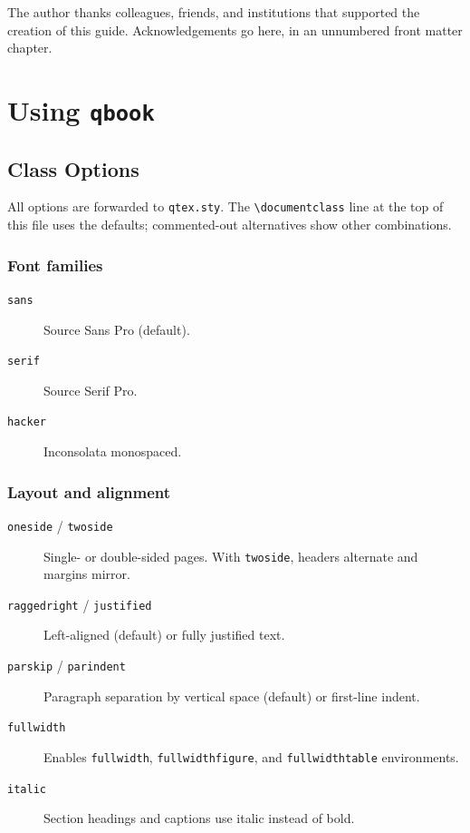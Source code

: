 \documentclass[sans,oneside,numeric,raggedright,fullwidth]{qbook}
\begin{document}
The author thanks colleagues, friends, and institutions that supported the
creation of this guide.  Acknowledgements go here, in an unnumbered front
matter chapter.

\lipsum[1]

\mainmatter

\chapter{Using \texttt{qbook}}\label{ch:using}

\section{Class Options}\label{sec:options}

All options are forwarded to \texttt{qtex.sty}.  The \verb|\documentclass|
line at the top of this file uses the defaults; commented-out alternatives
show other combinations.

\subsection{Font families}

\begin{description}
  \item[\texttt{sans}] Source Sans Pro (default).
  \item[\texttt{serif}] Source Serif Pro.
  \item[\texttt{hacker}] Inconsolata monospaced.
\end{description}

\subsection{Layout and alignment}

\begin{description}
  \item[\texttt{oneside} / \texttt{twoside}] Single- or double-sided pages.
    With \texttt{twoside}, headers alternate and margins mirror.
  \item[\texttt{raggedright} / \texttt{justified}] Left-aligned (default) or
    fully justified text.
  \item[\texttt{parskip} / \texttt{parindent}] Paragraph separation by
    vertical space (default) or first-line indent.
  \item[\texttt{fullwidth}] Enables \texttt{fullwidth},
    \texttt{fullwidthfigure}, and \texttt{fullwidthtable} environments.
  \item[\texttt{italic}] Section headings and captions use italic instead of
    bold.
\end{description}
\end{document}
